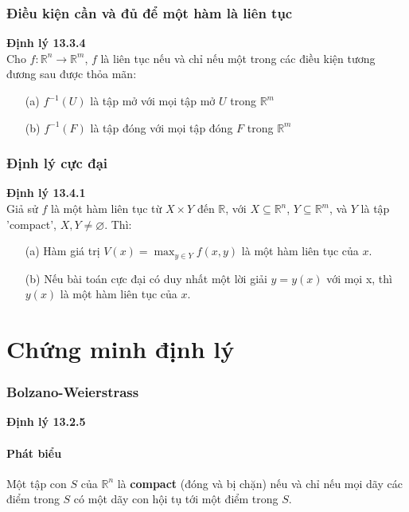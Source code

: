 \documentclass[12pt]{article}
\begin{document}
        \section{Điều kiện cần và đủ để một hàm là liên tục}
            {\bf Định lý 13.3.4}\\

            Cho $f: \mathbb{R}^n \to \mathbb{R}^m$, $f$ là liên tục nếu và chỉ nếu một trong các điều kiện tương đương sau được thỏa mãn:
            \begin{itemize}
                \item [(a)] $f^{-1}(U)$ là tập mở với mọi tập mở $U$ trong $\mathbb{R}^m$
                \item [(b)] $f^{-1}(F)$ là tập đóng với mọi tập đóng $F$ trong $\mathbb{R}^m$
            \end{itemize}
        \section{Định lý cực đại}
            {\bf Định lý 13.4.1}\\

            Giả sử $f$ là một hàm liên tục từ $X \times Y$ đến $\mathbb{R}$, với $X \subseteq \mathbb{R}^n$, $Y \subseteq \mathbb{R}^m$,
            và $Y$ là tập 'compact', $X,Y \neq \varnothing$. Thì:
            \begin{itemize}
                \item [(a)] Hàm giá trị $V(x) = \max_{y \in Y} f(x,y)$ là một hàm liên tục của $x$.
                \item [(b)] Nếu bài toán cực đại có duy nhất một lời giải $y = y(x)$ với mọi x, thì $y(x)$ là một hàm liên tục của $x$.
            \end{itemize}
    \newpage
    \part{Chứng minh định lý}
        \section{Bolzano-Weierstrass}
            {\bf Định lý 13.2.5}
            \subsection{Phát biểu}
                Một tập con $S$ của $\mathbb{R}^n$ là {\bf compact} (đóng và bị chặn) nếu và chỉ nếu 
                mọi dãy các điểm trong $S$ có một dãy con hội tụ tới một điểm trong $S$.
\end{document}

